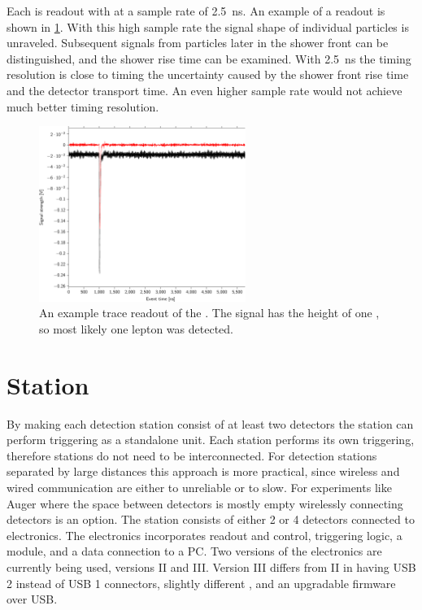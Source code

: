 Each \pmt is readout with \adcs at a sample rate of \SI{2.5}{\ns}. An example of a readout is shown in \cref{fig:trace}. With this high sample rate the signal shape of individual particles is unraveled. Subsequent signals from particles later in the shower front can be distinguished, and the shower rise time can be examined. With \SI{2.5}{\ns} the timing resolution is close to timing the uncertainty caused by the shower front rise time and the detector transport time. An even higher sample rate would not achieve much better timing resolution.

\begin{figure}
    \centering
    \includegraphics[width=0.6\textwidth]
                    {plots/experiment/trace}
    \caption{An example trace readout of the \pmt. The signal has the height of one \mip, so most likely one lepton was detected.}
    \label{fig:trace}
\end{figure}


\section{Station}

By making each detection station consist of at least two detectors the station can perform triggering as a standalone unit. Each station performs its own triggering, therefore stations do not need to be interconnected. For detection stations separated by large distances this approach is more practical, since wireless and wired communication are either to unreliable or to slow. For experiments like Auger where the space between detectors is mostly empty wirelessly connecting detectors is an option. The \hisparc station consists of either 2 or 4 detectors connected to \hisparc electronics. The \hisparc electronics incorporates \pmt readout and control, triggering logic, a \gps module, and a data connection to a PC. Two versions of the electronics are currently being used, versions II and III. Version III differs from II in having USB 2 instead of USB 1 connectors, slightly different \adcs, and an upgradable firmware over USB.

